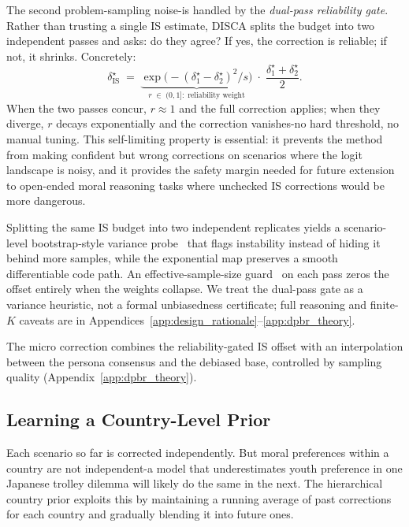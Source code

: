 \documentclass{article}
\begin{document}
The second problem-sampling noise-is handled by the \emph{dual-pass
reliability gate}. Rather than trusting a single IS estimate, DISCA splits
the budget into two independent passes and asks: do they agree? If yes, the
correction is reliable; if not, it shrinks. Concretely:
\begin{equation}
  \delta^{\star}_{\mathrm{IS}} \;=\;
    \underbrace{\exp\!\bigl(-(\delta^{\star}_1 - \delta^{\star}_2)^2 / s\bigr)}_{
      r\;\in\;(0,1]:\;\text{reliability weight}}
    \;\cdot\; \frac{\delta^{\star}_1 + \delta^{\star}_2}{2}.
  \label{eq:dpbr_rel}
\end{equation}
When the two passes concur, $r \approx 1$ and the full correction applies; when
they diverge, $r$ decays exponentially and the correction vanishes-no hard
threshold, no manual tuning. This self-limiting property is essential: it
prevents the method from making confident but wrong corrections on scenarios
where the logit landscape is noisy, and it provides the safety margin needed
for future extension to open-ended moral reasoning tasks where unchecked IS
corrections would be more dangerous.

Splitting the same IS budget into two independent replicates yields a
scenario-level bootstrap-style variance probe~\citep{efron1979bootstrap,
elvira2021advances} that flags instability instead of hiding it behind more
samples, while the exponential map preserves a smooth differentiable code
path. An effective-sample-size guard~\citep{kish1965survey} on each pass
zeros the offset entirely when the weights collapse. We treat the dual-pass
gate as a variance heuristic, not a formal unbiasedness certificate; full
reasoning and finite-$K$ caveats are in
Appendices~\ref{app:design_rationale}--\ref{app:dpbr_theory}.

The micro correction combines the reliability-gated IS offset with an
interpolation between the persona consensus and the debiased base, controlled
by sampling quality (Appendix~\ref{app:dpbr_theory}).

\subsection{Learning a Country-Level Prior}
\label{sec:method:prior}

Each scenario so far is corrected independently. But moral preferences within a
country are not independent-a model that underestimates youth preference in
one Japanese trolley dilemma will likely do the same in the next. The
hierarchical country prior exploits this by maintaining a running average of
past corrections for each country and gradually blending it into future ones.
\end{document}

